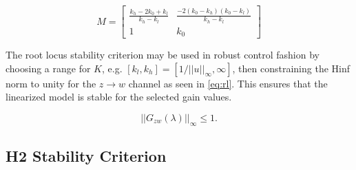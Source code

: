 \begin{equation}
	M = 
	\begin{bmatrix}
		\frac{k_h - 2k_0 + k_l}{k_h - k_l} & \frac{-2(k_0 - k_h)(k_0 - k_l)}{k_h - k_l} \\
		1 & k_0
	\end{bmatrix}  \label{eq:lft-range}
\end{equation}

The root locus stability criterion may be used in robust control fashion by choosing a range for $K$, e.g. $[k_l, k_h] = [1/||u||_\infty, \infty]$, then constraining the \gls{Hinf} norm to unity for the $z \rightarrow w$ channel as seen in \autoref{eq:rl}. This ensures that the linearized model is stable for the selected gain values.
 
 \begin{equation}
 	||G_{zw}(\lambda)||_\infty \leq 1. \label{eq:rl}
 \end{equation}
 
 \subsection{\gls{H2} Stability Criterion}
 \label{sec:stab-h2}
 
